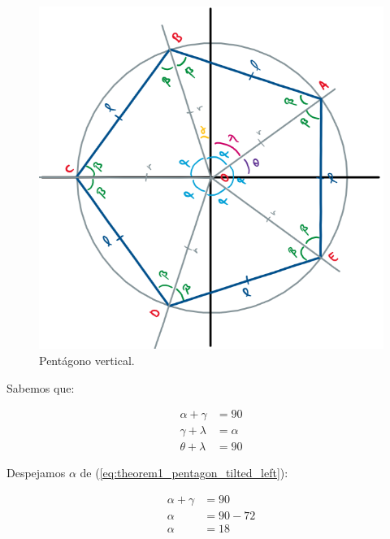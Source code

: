 \documentclass[oneside, a4paper]{article}
\begin{document}
            \begin{figure}[H]
                \centering
                \includegraphics[scale=0.5]{pentagon_tilted_left.png}
                \caption{Pentágono vertical.}
                \label{fig:pentagon_tilted_left}
            \end{figure}

            Sabemos que:

            \begin{align}
                \alpha + \gamma  & = 90\label{eq:theorem1_pentagon_tilted_left}     \\
                \gamma + \lambda & = \alpha\label{eq:theorem2_pentagon_tilted_left} \\
                \theta + \lambda & = 90\label{eq:theorem3_pentagon_tilted_left}
            \end{align}

            Despejamos $\alpha$ de (\ref{eq:theorem1_pentagon_tilted_left}):

            \begin{align}
                \alpha + \gamma & = 90 \nonumber\\
                \alpha & = 90 - 72 \nonumber\\
                \alpha & = 18 \label{eq:alpha_angle}
            \end{align}
\end{document}

